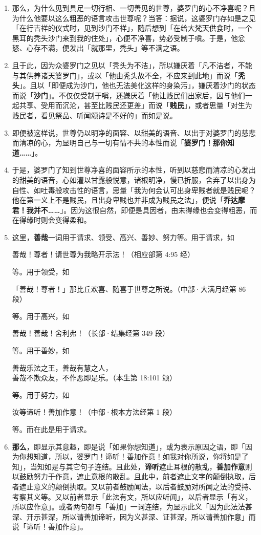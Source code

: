 \begin{enumerate}\item 那么，为什么见到具足一切行相、一切善见的世尊，婆罗门的心不净喜呢？且为什么他要以这么粗恶的语言攻击世尊呢？当答：据说，这婆罗门存如是之见「在行吉祥的仪式时，见到沙门不祥」，随后想到「在给大梵天供食时，一个黑耳的秃头沙门来到我的住处」，心便不净喜，势必受制于嗔。于是，他忿怒、心存不满，便发出「就那里，秃头」等不满之语。
\item 且于此，因为众婆罗门之见以「秃头为不洁」，所以嫌厌着「凡不洁者，不能与其供养诸天婆罗门」，或以「他由秃头故不全，不应来到此地」而说「\textbf{秃头}」。且以「即便成为沙门，他也无法美化这样的身染污」，嫌厌着沙门的状态而说「\textbf{沙门}」。不仅仅受制于嗔，还嫌厌着「他让贱民们出家后，因与他们一起共享、受用而沉沦，甚至比贱民还更差」而说「\textbf{贱民}」，或者思量「对生为贱民者，看见祭品、听闻颂诗是不好的」而如是说。
\item 即便被这样说，世尊仍以明净的面容、以甜美的语音、以出于对婆罗门的慈悲而清凉的心，为显明自己与一切有情不共的本性而说「\textbf{婆罗门！那你知道……}」。
\item 于是，婆罗门了知到世尊净喜的面容所示的本性，听到以慈悲而清凉的心发出的甜美的语音，心如灌以甘露般悦意，诸根明净，慢已折服，舍弃了以出身为自性、如吐毒般攻击性的语言，思量「我为何会认可出身卑贱者就是贱民呢？他在第一义上不是贱民，且出身卑贱也并非成为贱民之法」，便说「\textbf{乔达摩君！我并不……}」。因为这很自然，即便是具因者，由未得缘也会变得粗恶，而在得缘时则会变得柔和。
\item 这里，\textbf{善哉}一词用于请求、领受、高兴、善妙、努力等。用于请求，如\begin{quoting}善哉！尊者！请世尊为我略开示法！（相应部第 4:95 经）\end{quoting}等。用于领受，如\begin{quoting}「善哉！尊者！」那比丘欢喜、随喜于世尊之所说。（中部·大满月经第 86 段）\end{quoting}等。用于高兴，如\begin{quoting}善哉！善哉！舍利弗！（长部·结集经第 349 段）\end{quoting}等。用于善妙，如\begin{quoting}善哉乐法之王，善哉有慧之人，\\善哉不欺众友，不作恶即是乐。（本生第 18:101 颂）\end{quoting}等。用于努力，如\begin{quoting}汝等谛听！善加作意！（中部·根本方法经第 1 段）\end{quoting}等。而在此是用于请求。
\item \textbf{那么}，即显示其意趣，即是说「如果你想知道」，或为表示原因之语，即「因为你想知道，所以，婆罗门！谛听！善加作意！如我对你所说，你将如是了知」，当知如是与其它句子连结。且此处，\textbf{谛听}遮止耳根的散乱，\textbf{善加作意}则以鼓励努力于作意，遮止意根的散乱。且此中，前者遮止文字的颠倒执取，后者遮止意义的颠倒执取。又以前者鼓励闻法，以后者鼓励对所闻之法的受持、考察其义等。又以前者显示「此法有文，所以应听闻」，以后者显示「有义，所以应作意」。或者两句都与「善加」一词连结，为显示此义「因为此法法甚深、开示甚深，所以请善加谛听，因为义甚深、证甚深，所以请善加作意」而说「谛听！善加作意」。

\end{enumerate}
